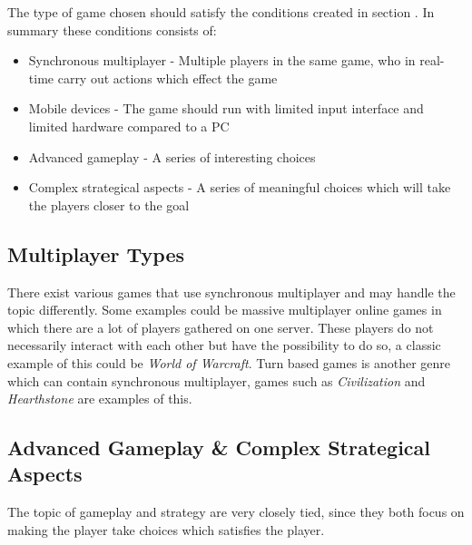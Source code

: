 The type of game chosen should satisfy the conditions created in section \cite{sec:specifyingtheproblemstatement}.
In summary these conditions consists of:
\begin{itemize}
\item Synchronous multiplayer - Multiple players in the same game, who in real-time carry out actions which effect the game
\item Mobile devices - The game should run with limited input interface and limited hardware compared to a PC
\item Advanced gameplay - A series of interesting choices
\item Complex strategical aspects - A series of meaningful choices which will take the players closer to the goal
\end{itemize}

\subsection{Multiplayer Types}
There exist various games that use synchronous multiplayer and may handle the topic differently. 
Some examples could be massive multiplayer online games in which there are a lot of players gathered on one server.
These players do not necessarily interact with each other but have the possibility to do so, a classic example of this could be \textit{World of Warcraft}\cite{wow}. 
Turn based games is another genre which can contain synchronous multiplayer, games such as \textit{Civilization} and \textit{Hearthstone}\cite{hearthstone} are examples of this. 

\subsection{Advanced Gameplay \& Complex Strategical Aspects}
The topic of gameplay and strategy are very closely tied, since they both focus on making the player take choices which satisfies the player.

